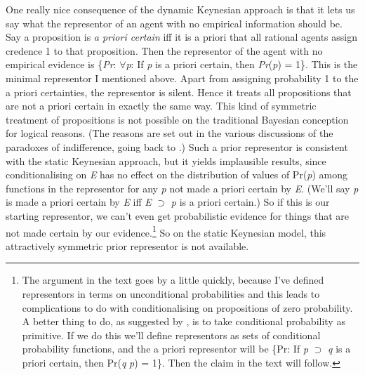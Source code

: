 One really nice consequence of the dynamic Keynesian approach is that it lets us say what the representor of an agent with no empirical information should be. Say a proposition is \textit{a priori certain} iff it is a priori that all rational agents assign credence 1 to that proposition. Then the representor of the agent with no empirical evidence is \{\textit{Pr}: ${\forall}$\textit{p}: If \textit{p} is a priori certain, then \textit{Pr}(\textit{p}) = 1\}. This is the minimal representor I mentioned above. Apart from assigning probability 1 to the a priori certainties, the representor is silent. Hence it treats all propositions that are not a priori certain in exactly the same way. This kind of symmetric treatment of propositions is not possible on the traditional Bayesian conception for logical reasons. (The reasons are set out in the various discussions of the paradoxes of indifference, going back to \citet{Bertrand1888}.) Such a prior representor is consistent with the static Keynesian approach, but it yields implausible results, since conditionalising on \textit{E} has no effect on the distribution of values of Pr(\textit{p}) among functions in the representor for any \textit{p} not made a priori certain by \textit{E}. (We'll say \textit{p} is made a priori certain by \textit{E} iff \textit{E} ${\supset}$ \textit{p} is a priori certain.) So if this is our starting representor, we can't even get probabilistic evidence for things that are not made certain by our evidence.\footnote{ The argument in the text goes by a little quickly, because I've defined representors in terms on unconditional probabilities and this leads to complications to do with conditionalising on propositions of zero probability. A better thing to do, as suggested by \citet{Hajek2003}, is to take conditional probability as primitive. If we do this we'll define representors as sets of conditional probability functions, and the a priori representor will be \{Pr: If \textit{p} ${\supset}$ \textit{q} is a priori certain, then Pr(\textit{q} {\textbar} \textit{p}) = 1\}. Then the claim in the text will follow.} So on the static Keynesian model, this attractively symmetric prior representor is not available.

